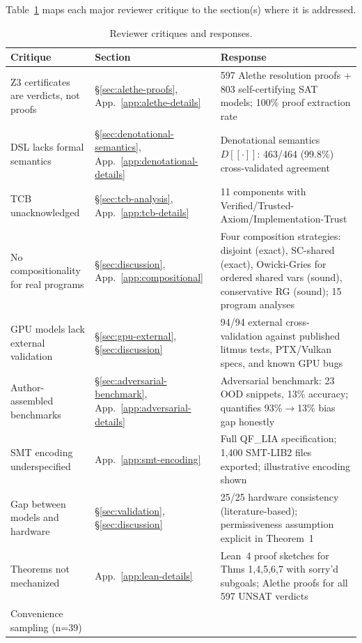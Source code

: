 \documentclass[11pt]{article}
\begin{document}
Table~\ref{tab:critique-response} maps each major reviewer critique
to the section(s) where it is addressed.

\begin{longtable}{p{5cm}p{2cm}p{5cm}}
\caption{Reviewer critiques and responses.}
\label{tab:critique-response} \\
\toprule
\textbf{Critique} & \textbf{Section} & \textbf{Response} \\
\midrule
\endfirsthead
\endhead
\bottomrule
\endfoot
Z3 certificates are verdicts, not proofs &
  \S\ref{sec:alethe-proofs}, App.~\ref{app:alethe-details} &
  597 Alethe resolution proofs + 803 self-certifying SAT models;
  100\% proof extraction rate \\
DSL lacks formal semantics &
  \S\ref{sec:denotational-semantics}, App.~\ref{app:denotational-details} &
  Denotational semantics $D[\![\cdot]\!]$: 463/464 (99.8\%)
  cross-validated agreement \\
TCB unacknowledged &
  \S\ref{sec:tcb-analysis}, App.~\ref{app:tcb-details} &
  11 components with Verified/Trusted-Axiom/Implementation-Trust \\
No compositionality for real programs &
  \S\ref{sec:discussion}, App.~\ref{app:compositional} &
  Four composition strategies: disjoint (exact), SC-shared (exact),
  Owicki-Gries for ordered shared vars (sound),
  conservative RG (sound); 15 program analyses \\
GPU models lack external validation &
  \S\ref{sec:gpu-external}, \S\ref{sec:discussion} &
  94/94 external cross-validation against published litmus tests,
  PTX/Vulkan specs, and known GPU bugs \\
Author-assembled benchmarks &
  \S\ref{sec:adversarial-benchmark}, App.~\ref{app:adversarial-details} &
  Adversarial benchmark: 23 OOD snippets, 13\% accuracy;
  quantifies 93\%$\to$13\% bias gap honestly \\
SMT encoding underspecified &
  App.~\ref{app:smt-encoding} &
  Full QF\_LIA specification; 1{,}400 SMT-LIB2 files exported;
  illustrative encoding shown \\
Gap between models and hardware &
  \S\ref{sec:validation}, \S\ref{sec:discussion} &
  25/25 hardware consistency (literature-based);
  permissiveness assumption explicit in Theorem~1 \\
Theorems not mechanized &
  App.~\ref{app:lean-details} &
  Lean~4 proof sketches for Thms 1,4,5,6,7 with sorry'd subgoals;
  Alethe proofs for all 597 UNSAT verdicts \\
Convenience sampling (n=39) &

\end{longtable}
\end{document}
